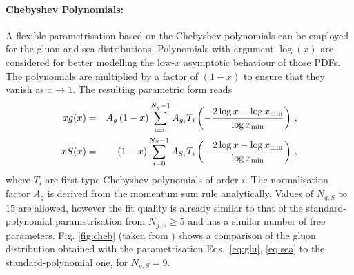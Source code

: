 \paragraph{Chebyshev Polynomials:} 
A flexible parametrisation  based on the Chebyshev polynomials can be employed for the gluon and sea distributions.
Polynomials with argument $\log(x)$ are considered for better modelling the low-$x$ asymptotic behaviour of those PDFs. 
The polynomials are multiplied
by a factor of $(1-x)$ to ensure that they vanish as $x\to 1$. The resulting parametric form reads
\begin{eqnarray}
x g(x) &=& A_g \left(1-x\right) \sum_{i=0}^{N_g-1} A_{g_i} T_i \left(-\frac{\textstyle 2\log x - \log x_{\rm min} } {\textstyle \log x_{\rm min} } \right)\,, \label{eq:glu} \\
x S(x) &=& \left(1-x\right) \sum_{i=0}^{N_S-1} A_{S_i} T_i \left(-\frac{\textstyle 2\log x - \log x_{\rm min} } {\textstyle \log x_{\rm min} } \right)\,, \label{eq:sea} 
\end{eqnarray}
where $T_i$ are first-type Chebyshev polynomials of order $i$.
The normalisation factor $A_g$ is derived from the momentum sum rule analytically.
Values of $N_{g,S}$ to $15$ are allowed, however the fit quality is already similar
to that of the standard-polynomial parametrisation from $N_{g,S} \ge 5$  and has a similar number of free parameters.
%
%
Fig. \ref{fig:cheb} (taken from \cite{Chebyshev})
shows a comparison of the gluon distribution obtained with the parametrisation Eqs.~\ref{eq:glu}, \ref{eq:sea} to 
the standard-polynomial one, for $N_{g,S} = 9$.

